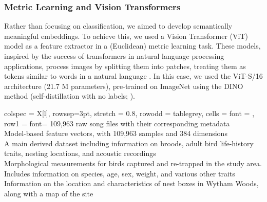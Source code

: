\subsubsection{Metric Learning and Vision Transformers}
Rather than focusing on classification, we aimed to develop semantically meaningful embeddings. To achieve this, we used a Vision Transformer (ViT) model as a feature extractor in a (Euclidean) metric learning task. These models, inspired by the success of transformers in natural language processing applications, process images by splitting them into patches, treating them as tokens similar to words in a natural language \parencite{dosovitskiy2021, raghu2022}. In this case, we used the ViT-S/16 architecture (21.7 M parameters), pre-trained on ImageNet using the DINO method (self-distillation with no labels; \cite{caron2021}).

\begin{table}
    \centering
    \label{table:summary}
    \begin{tblr}[
        theme=ntabs
        ]{
        colspec = {X[l]},
        rowsep=3pt,
        stretch = 0.8,
        row{odd} = {tablegrey}, %
        cells = {font = \fontsize{8pt}{8pt}\selectfont},
        row{1} = {font=\fontsize{8pt}{8pt}\selectfont} %
    }
        109,963 raw song files with their corresponding metadata\\
        Model-based feature vectors, with 109,963 samples and 384 dimensions\\
        A main derived dataset including information on broods, adult bird life-history traits, nesting locations, and acoustic recordings\\
        Morphological measurements for birds captured and re-trapped in the study area. Includes information on species, age, sex, weight, and various other traits\\
        Information on the location and characteristics of nest boxes in Wytham Woods, along with a map of the site\\
    \end{tblr}
\end{table}

